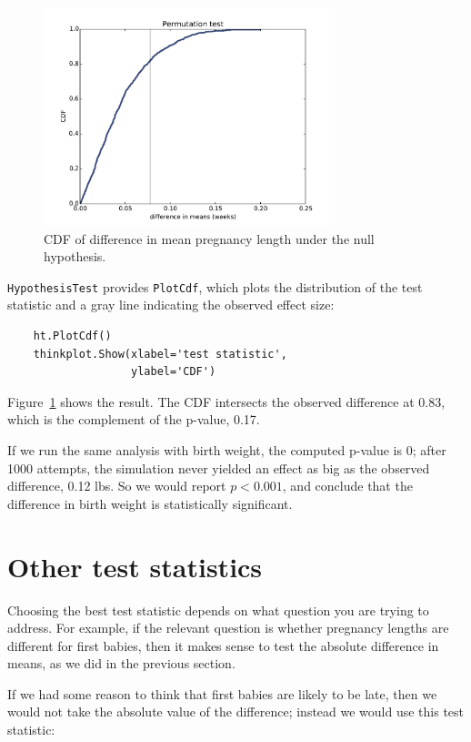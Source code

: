\documentclass[12pt]{book}
\begin{document}
\begin{figure}
\centerline{\includegraphics[height=2.5in]{figs/hypothesis1.pdf}}
\caption{CDF of difference in mean pregnancy length under the null
hypothesis.}
\label{hypothesis1}
\end{figure}

{\tt HypothesisTest} provides {\tt PlotCdf}, which plots the
distribution of the test statistic and a gray line indicating
the observed effect size:

\begin{verbatim}
    ht.PlotCdf()
    thinkplot.Show(xlabel='test statistic',
                   ylabel='CDF')
\end{verbatim}

Figure~\ref{hypothesis1} shows the result.  The CDF intersects the
observed difference at 0.83, which is the complement of the p-value,
0.17.

If we run the same analysis with birth weight, the computed p-value
is 0; after 1000 attempts,
the simulation never yielded an effect
as big as the observed difference, 0.12 lbs.  So we would
report $p < 0.001$, and
conclude that the difference in birth weight is statistically
significant.


\section{Other test statistics}

Choosing the best test statistic depends on what question you are
trying to address.  For example, if the relevant question is whether
pregnancy lengths are different for first
babies, then it makes sense to test the absolute difference in means,
as we did in the previous section.

If we had some reason to think that first babies are likely
to be late, then we would not take the absolute value of the difference;
instead we would use this test statistic:
\end{document}

